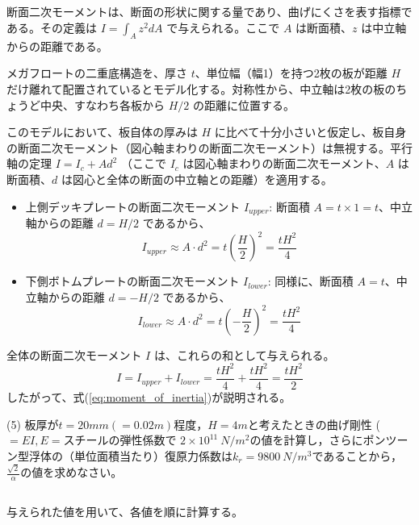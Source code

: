 \documentclass[dvipdfmx,a4paper]{jsarticle}
\begin{document}
    \subsection*{}
    断面二次モーメントは、断面の形状に関する量であり、曲げにくさを表す指標である。その定義は $I = \int_A z^2 dA$ で与えられる。ここで $A$ は断面積、$z$ は中立軸からの距離である。
    
    メガフロートの二重底構造を、厚さ $t$、単位幅（幅1）を持つ2枚の板が距離 $H$ だけ離れて配置されているとモデル化する。対称性から、中立軸は2枚の板のちょうど中央、すなわち各板から $H/2$ の距離に位置する。
    
    このモデルにおいて、板自体の厚みは $H$ に比べて十分小さいと仮定し、板自身の断面二次モーメント（図心軸まわりの断面二次モーメント）は無視する。平行軸の定理 $I = I_c + A d^2$ （ここで $I_c$ は図心軸まわりの断面二次モーメント、$A$ は断面積、$d$ は図心と全体の断面の中立軸との距離）を適用する。
    
    \begin{itemize}
        \item 上側デッキプレートの断面二次モーメント $I_{upper}$:
        断面積 $A = t \times 1 = t$、中立軸からの距離 $d = H/2$ であるから、
        $$ I_{upper} \approx A \cdot d^2 = t \left( \frac{H}{2} \right)^2 = \frac{tH^2}{4} $$
        
        \item 下側ボトムプレートの断面二次モーメント $I_{lower}$:
        同様に、断面積 $A=t$、中立軸からの距離 $d = -H/2$ であるから、
        $$ I_{lower} \approx A \cdot d^2 = t \left( -\frac{H}{2} \right)^2 = \frac{tH^2}{4} $$
    \end{itemize}
    
    全体の断面二次モーメント $I$ は、これらの和として与えられる。
    $$ I = I_{upper} + I_{lower} = \frac{tH^2}{4} + \frac{tH^2}{4} = \frac{tH^2}{2} $$
    したがって、式(\ref{eq:moment_of_inertia})が説明される。
    
    \vspace{1cm}
    
    (5) 板厚が$t=20mm(=0.02m)$程度，$H=4m$と考えたときの曲げ剛性 ($=EI,E=\text{スチールの弾性係数}$で $2\times10^{11}\ N/m^2$の値を計算し，さらにポンツーン型浮体の（単位面積当たり）復原力係数は$k_r=9800\  N/m^3$であることから，$\frac{\sqrt{2}}{\alpha}$の値を求めなさい。
    
    \subsection*{}
    与えられた値を用いて、各値を順に計算する。
    
\end{document}
